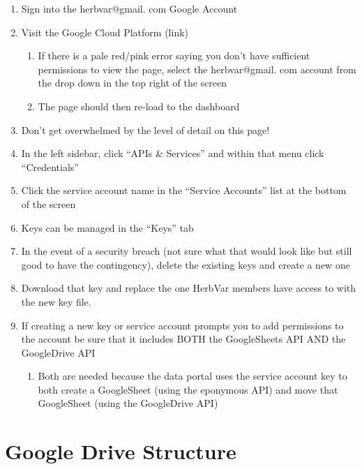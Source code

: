 \documentclass[
  letterpaper,
  oneside,
  open=any]{scrbook}
\providecommand{\tightlist}{%
  \setlength{\itemsep}{0pt}\setlength{\parskip}{0pt}}\usepackage{longtable,booktabs,array}
\begin{document}
\begin{enumerate}
\def\labelenumi{\arabic{enumi}.}
\item
  Sign into the herbvar@gmail. com Google Account
\item
  Visit the Google Cloud Platform (link)

  \begin{enumerate}
  \def\labelenumii{\alph{enumii}.}
  \item
    If there is a pale red/pink error saying you don't have sufficient
    permissions to view the page, select the herbvar@gmail. com account
    from the drop down in the top right of the screen
  \item
    The page should then re-load to the dashboard
  \end{enumerate}
\item
  Don't get overwhelmed by the level of detail on this page!
\item
  In the left sidebar, click ``APIs \& Services'' and within that menu
  click ``Credentials''
\item
  Click the service account name in the ``Service Accounts'' list at the
  bottom of the screen
\item
  Keys can be managed in the ``Keys'' tab
\item
  In the event of a security breach (not sure what that would look like
  but still good to have the contingency), delete the existing keys and
  create a new one
\item
  Download that key and replace the one HerbVar members have access to
  with the new key file.
\item
  If creating a new key or service account prompts you to add
  permissions to the account be sure that it includes BOTH the
  GoogleSheets API AND the GoogleDrive API

  \begin{enumerate}
  \def\labelenumii{\alph{enumii}.}
  \tightlist
  \item
    Both are needed because the data portal uses the service account key
    to both create a GoogleSheet (using the eponymous API) and move that
    GoogleSheet (using the GoogleDrive API)
  \end{enumerate}
\end{enumerate}

\chapter{Google Drive Structure}\label{google-drive-structure}
\end{document}
